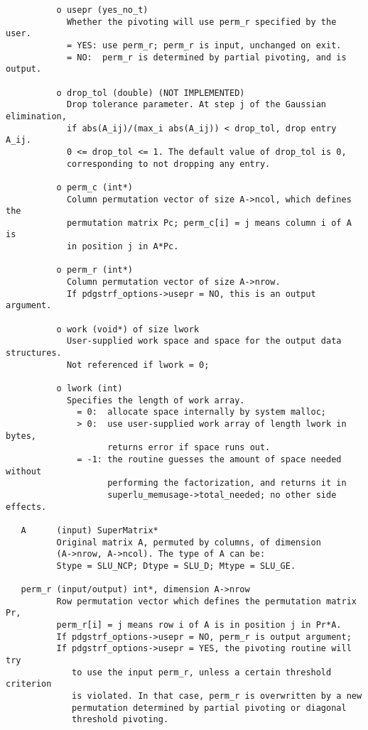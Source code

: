 \begin{verbatim}
          o usepr (yes_no_t)
            Whether the pivoting will use perm_r specified by the user.
            = YES: use perm_r; perm_r is input, unchanged on exit.
            = NO:  perm_r is determined by partial pivoting, and is output.
  
          o drop_tol (double) (NOT IMPLEMENTED)
            Drop tolerance parameter. At step j of the Gaussian elimination,
            if abs(A_ij)/(max_i abs(A_ij)) < drop_tol, drop entry A_ij.
            0 <= drop_tol <= 1. The default value of drop_tol is 0,
            corresponding to not dropping any entry.
  
          o perm_c (int*)
            Column permutation vector of size A->ncol, which defines the 
            permutation matrix Pc; perm_c[i] = j means column i of A is 
            in position j in A*Pc.
  
          o perm_r (int*)
            Column permutation vector of size A->nrow.
            If pdgstrf_options->usepr = NO, this is an output argument.
  
          o work (void*) of size lwork
            User-supplied work space and space for the output data structures.
            Not referenced if lwork = 0;
  
          o lwork (int)
            Specifies the length of work array.
              = 0:  allocate space internally by system malloc;
              > 0:  use user-supplied work array of length lwork in bytes,
                    returns error if space runs out.
              = -1: the routine guesses the amount of space needed without
                    performing the factorization, and returns it in
                    superlu_memusage->total_needed; no other side effects.
  
   A      (input) SuperMatrix*
          Original matrix A, permuted by columns, of dimension
          (A->nrow, A->ncol). The type of A can be:
          Stype = SLU_NCP; Dtype = SLU_D; Mtype = SLU_GE.
  
   perm_r (input/output) int*, dimension A->nrow
          Row permutation vector which defines the permutation matrix Pr,
          perm_r[i] = j means row i of A is in position j in Pr*A.
          If pdgstrf_options->usepr = NO, perm_r is output argument;
          If pdgstrf_options->usepr = YES, the pivoting routine will try 
             to use the input perm_r, unless a certain threshold criterion
             is violated. In that case, perm_r is overwritten by a new
             permutation determined by partial pivoting or diagonal 
             threshold pivoting.
  

\end{verbatim}
